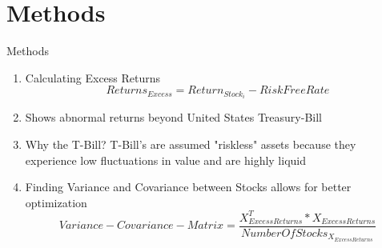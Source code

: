 \documentclass[handout,t]{beamer}
\begin{document}
    \section{Methods}
        \begin{frame}[allowframebreaks]{Methods}
        	\begin{doublespacing}
            	\begin{enumerate}
            	    \item Calculating Excess Returns
            	        \begin{equation} \label{Excess Returns}
                            Returns_{Excess} = Return_{Stock_{i}} - RiskFreeRate
                        \end{equation}
            	    \item Shows abnormal returns beyond United States Treasury-Bill 
            	    \item Why the T-Bill? T-Bill's are assumed "riskless" assets because they experience low fluctuations in value and are highly liquid
            	    
            	    \framebreak
            	    \item Finding Variance and Covariance between Stocks allows for better optimization
                         \begin{equation} \label{Variance-Covariance-Matrix}
                                Variance-Covariance-Matrix = 
                                \frac{X^{T}_{Excess Returns} * X_{Excess Returns}}
                                {Number Of Stocks_{X_{Excess Returns}}} 
                        \end{equation}
            	    

\end{enumerate}
\end{doublespacing}
\end{frame}
\end{document}
